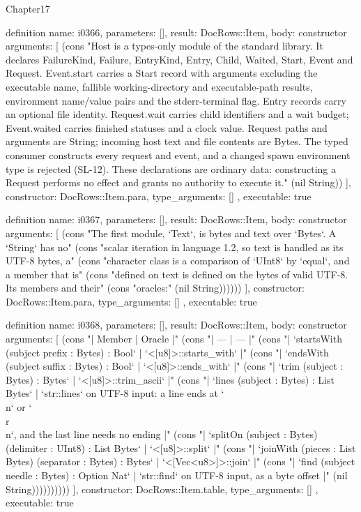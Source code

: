 \begin{lexlean}{Chapter17}
\begin{semanticmodule}
definition{
  name: i0366,
  parameters: [],
  result: DocRows::Item,
  body: constructor{
    arguments: [
      (cons "Host is a types-only module of the standard library. It declares FailureKind, Failure, EntryKind, Entry, Child, Waited, Start, Event and Request. Event.start carries a Start record with arguments excluding the executable name, fallible working-directory and executable-path results, environment name/value pairs and the stderr-terminal flag. Entry records carry an optional file identity. Request.wait carries child identifiers and a wait budget; Event.waited carries finished statuses and a clock value. Request paths and arguments are String; incoming host text and file contents are Bytes. The typed consumer constructs every request and event, and a changed spawn environment type is rejected (SL-12). These declarations are ordinary data: constructing a Request performs no effect and grants no authority to execute it." (nil String))
    ],
    constructor: DocRows::Item.para,
    type_arguments: []
  },
  executable: true
}

definition{
  name: i0367,
  parameters: [],
  result: DocRows::Item,
  body: constructor{
    arguments: [
      (cons "The first module, `Text`, is bytes and text over `Bytes`. A `String` has no" (cons "scalar iteration in language 1.2, so text is handled as its UTF-8 bytes, a" (cons "character class is a comparison of `UInt8` by `equal`, and a member that is" (cons "defined on text is defined on the bytes of valid UTF-8. Its members and their" (cons "oracles:" (nil String))))))
    ],
    constructor: DocRows::Item.para,
    type_arguments: []
  },
  executable: true
}

definition{
  name: i0368,
  parameters: [],
  result: DocRows::Item,
  body: constructor{
    arguments: [
      (cons "| Member | Oracle |" (cons "| --- | --- |" (cons "| `startsWith (subject prefix : Bytes) : Bool` | `<[u8]>::starts_with` |" (cons "| `endsWith (subject suffix : Bytes) : Bool` | `<[u8]>::ends_with` |" (cons "| `trim (subject : Bytes) : Bytes` | `<[u8]>::trim_ascii` |" (cons "| `lines (subject : Bytes) : List Bytes` | `str::lines` on UTF-8 input: a line ends at `\\n` or `\\r\\n`, and the last line needs no ending |" (cons "| `splitOn (subject : Bytes) (delimiter : UInt8) : List Bytes` | `<[u8]>::split` |" (cons "| `joinWith (pieces : List Bytes) (separator : Bytes) : Bytes` | `<[Vec<u8>]>::join` |" (cons "| `find (subject needle : Bytes) : Option Nat` | `str::find` on UTF-8 input, as a byte offset |" (nil String))))))))))
    ],
    constructor: DocRows::Item.table,
    type_arguments: []
  },
  executable: true
}


\end{semanticmodule}
\end{lexlean}
